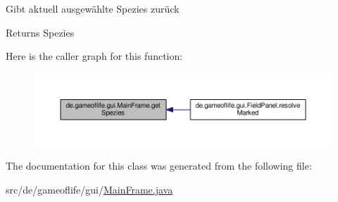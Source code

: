 Gibt aktuell ausgewählte Spezies zurück \begin{DoxyReturn}{Returns}
Spezies 
\end{DoxyReturn}


Here is the caller graph for this function\-:\nopagebreak
\begin{figure}[H]
\begin{center}
\leavevmode
\includegraphics[width=350pt]{classde_1_1gameoflife_1_1gui_1_1MainFrame_ab0477181994aa0d5c1495325ba4d064b_icgraph}
\end{center}
\end{figure}




The documentation for this class was generated from the following file\-:\begin{DoxyCompactItemize}
\item 
src/de/gameoflife/gui/\hyperlink{MainFrame_8java}{Main\-Frame.\-java}\end{DoxyCompactItemize}
